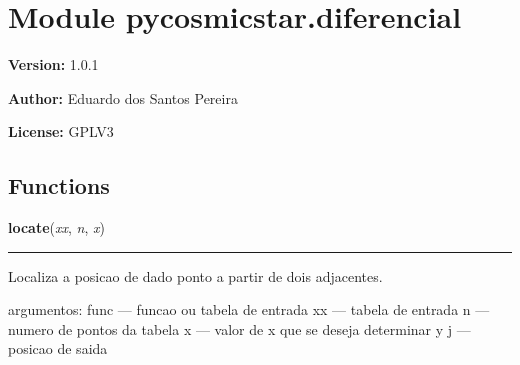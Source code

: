 %
%
%


\section{Module pycosmicstar.diferencial}

    \label{pycosmicstar:diferencial}
\textbf{Version:} 1.0.1



\textbf{Author:} Eduardo dos Santos Pereira



\textbf{License:} GPLV3





  \subsection{Functions}

    \label{pycosmicstar:diferencial:locate}

    \vspace{0.5ex}

\hspace{.8\funcindent}\begin{boxedminipage}{\funcwidth}

    \raggedright \textbf{locate}(\textit{xx}, \textit{n}, \textit{x})

    \vspace{-1.5ex}

    \rule{\textwidth}{0.5\fboxrule}
\setlength{\parskip}{2ex}
    Localiza a posicao de dado ponto a partir de dois adjacentes.

    argumentos:  func --- funcao ou tabela de entrada xx   --- tabela de 
    entrada n    --- numero de pontos da tabela x    --- valor de x que se 
    deseja determinar y j    --- posicao de saida

\setlength{\parskip}{1ex}
    \end{boxedminipage}

